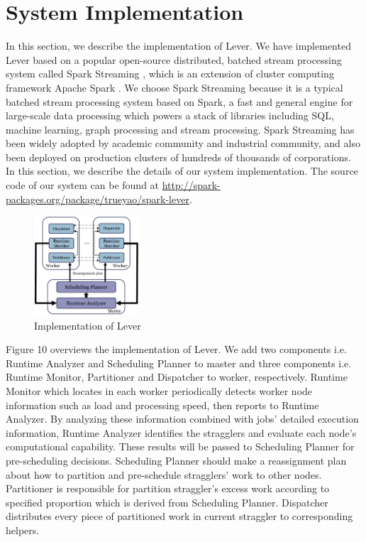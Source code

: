 \section{System Implementation}

  In this section, we describe the implementation of Lever. We have implemented Lever based on a popular open-source distributed, batched stream processing system called Spark Streaming \cite{spark-streaming}, which is an extension of cluster computing framework Apache Spark \cite{spark}. We choose Spark Streaming because it is a typical batched stream processing system based on Spark, a fast and general engine for large-scale data processing which powers a stack of libraries including SQL, machine learning, graph processing and stream processing. Spark Streaming has been widely adopted by academic community and industrial community, and also been deployed on production clusters of hundreds of thousands of corporations. In this section, we describe the details of our system implementation. The source code of our system can be found at \url{http://spark-packages.org/package/trueyao/spark-lever}.
  \begin{figure}[htbp]
    \centering
    \includegraphics[width=0.35\textwidth]{Figure7}
    \caption{Implementation of Lever}
    \label{Fig. 10:}
  \end{figure}

  Figure 10 overviews the implementation of Lever. We add two components i.e. Runtime Analyzer and Scheduling Planner to master and three components i.e. Runtime Monitor, Partitioner and Dispatcher to worker, respectively. Runtime Monitor which locates in each worker periodically detects worker node information such as load and processing speed, then reports to Runtime Analyzer. By analyzing these information combined with jobs' detailed execution information, Runtime Analyzer identifies the stragglers and evaluate each node's computational capability. These results will be passed to Scheduling Planner for pre-scheduling decisions. Scheduling Planner should make a reassignment plan about how to partition and pre-schedule stragglers' work to other nodes. Partitioner is responsible for partition straggler's excess work according to specified proportion which is derived from Scheduling Planner. Dispatcher distributes every piece of partitioned work in current straggler to corresponding helpers.

